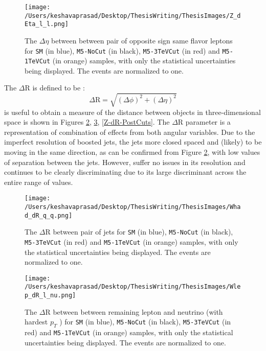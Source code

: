 \begin{figure}[!htb]%
		\centering
		\texttt{[image: /Users/keshavaprasad/Desktop/ThesisWriting/ThesisImages/Z\_dEta\_l\_l.png]}
		\caption{The $\Delta\eta$ between between pair of opposite sign same flavor leptons for \texttt{SM} (in blue), \texttt{M5-NoCut} (in black), \texttt{M5-3TeVCut} (in red) and \texttt{M5-1TeVCut} (in orange) samples, with only the statistical uncertainties being displayed. The events are normalized to one.}
		\label{ZleplepdEta-PostCuts}
\end{figure}

The $\Delta \text{R}$ is defined to be : 
\begin{equation}
\Delta \text{R}  = \sqrt{(\Delta\phi)^2+(\Delta\eta)^2}
\end{equation} is useful to obtain a measure of the distance between objects in three-dimensional space is shown in Figures \ref{Whad-dR-PostCuts},  \ref{WLep-dR-PostCuts}, \ref{Z-dR-PostCuts}. The $\Delta \text{R}$ parameter is a representation of combination of effects from both angular variables. Due to the imperfect resolution of boosted jets, the jets more closed spaced and (likely) to be moving in the same direction, as can be confirmed from Figure \ref{Whad-dR-PostCuts}, with low values of separation between the jets. However, suffer no issues in its resolution and continues to be clearly discriminating due to its large discriminant across the entire range of values. 

	\begin{figure}[!htb]%
		\centering
		\texttt{[image: /Users/keshavaprasad/Desktop/ThesisWriting/ThesisImages/Whad\_dR\_q\_q.png]}
		\caption{The $\Delta \text{R}$ between pair of jets for \texttt{SM} (in blue), \texttt{M5-NoCut} (in black), \texttt{M5-3TeVCut} (in red) and \texttt{M5-1TeVCut} (in orange) samples, with only the statistical uncertainties being displayed. The events are normalized to one.}
		\label{Whad-dR-PostCuts}
	\end{figure}
	\begin{figure}[!h]%
		\centering
		\texttt{[image: /Users/keshavaprasad/Desktop/ThesisWriting/ThesisImages/Wlep\_dR\_l\_nu.png]}
		\caption{The $\Delta \text{R}$  between between remaining lepton and neutrino (with hardest $p_{T}$ ) for \texttt{SM} (in blue), \texttt{M5-NoCut} (in black), \texttt{M5-3TeVCut} (in red) and \texttt{M5-1TeVCut} (in orange) samples, with only the statistical uncertainties being displayed. The events are normalized to one.}
		\label{WLep-dR-PostCuts}
	\end{figure}

